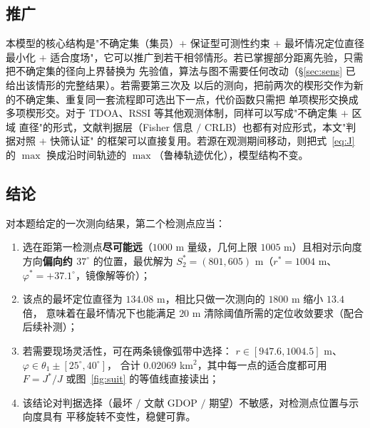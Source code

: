 \subsection{推广}

本模型的核心结构是"不确定集（集员）$+$ 保证型可测性约束 $+$ 最坏情况定位直径最小化 $+$
适合度场"，它可以推广到若干相邻情形。若已掌握部分距离先验，只需把不确定集的径向上界替换为
先验值，算法与图不需要任何改动（§\ref{sec:sens} 已给出该情形的完整结果）。若需要第三次及
以后的测向，把前两次的楔形交作为新的不确定集、重复同一套流程即可选出下一点，代价函数只需把
单项楔形交换成多项楔形交。对于 TDOA、RSSI 等其他观测体制，同样可以写成"不确定集 $+$ 区域
直径"的形式，文献判据层（Fisher 信息 $/$ CRLB）也都有对应形式，本文"判据对照 $+$ 快筛认证"
的框架可以直接复用。若源在观测期间移动，则把式~\eqref{eq:J} 的 $\max$ 换成沿时间轨迹的
$\max$（鲁棒轨迹优化），模型结构不变。

\subsection{结论}

对本题给定的一次测向结果，第二个检测点应当：

\begin{enumerate}
  \item 选在距第一检测点\textbf{尽可能远}（$1000$ m 量级，几何上限 $1005$ m）且相对示向度
        方向\textbf{偏向约 $37^\circ$} 的位置，最优解为
        $S_2^*=(801,605)$ m（$r^*=1004$ m、$\varphi^*=+37.1^\circ$，镜像解等价）；
  \item 该点的最坏定位直径为 $134.08$ m，相比只做一次测向的 $1800$ m 缩小 $13.4$ 倍，
        意味着在最坏情况下也能满足 $20$ m 清除阈值所需的定位收敛要求（配合后续补测）；
  \item 若需要现场灵活性，可在两条镜像弧带中选择：
        $r\in[947.6,1004.5]$ m、$\varphi\in\theta_1\pm[25^\circ,40^\circ]$，
        合计 $0.02069$ km$^2$，其中每一点的适合度都可用 $F=J^*/J$ 或图~\ref{fig:suit}
        的等值线直接读出；
  \item 该结论对判据选择（最坏 $/$ 文献 GDOP $/$ 期望）不敏感，对检测点位置与示向度具有
        平移旋转不变性，稳健可靠。
\end{enumerate}
